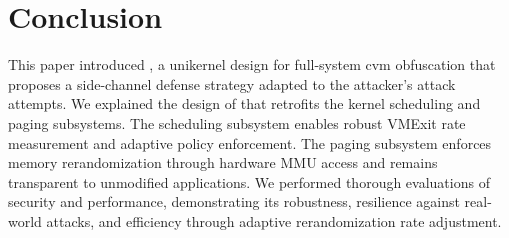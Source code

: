 \section{Conclusion}
This paper introduced \thename, a unikernel design for full-system \gls{cvm} obfuscation that proposes a side-channel defense strategy adapted to the attacker's attack attempts.
We explained the design of \thename that retrofits the kernel scheduling and paging subsystems.
The scheduling subsystem enables robust VMExit rate measurement and adaptive policy enforcement.
The paging subsystem enforces memory rerandomization through hardware MMU access and remains transparent to unmodified applications.
We performed thorough evaluations of \thename security and performance, demonstrating its robustness, resilience against real-world attacks, and efficiency through adaptive rerandomization rate adjustment.
